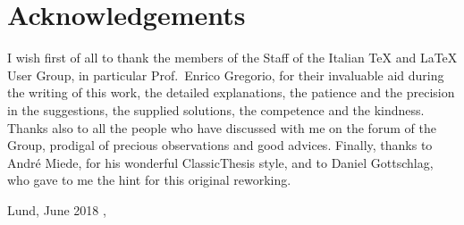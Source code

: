 
\begingroup
\let\clearpage\relax
\let\cleardoublepage\relax
\let\cleardoublepage\relax

\chapter*{Acknowledgements}
\rmfamily
I wish first of all to thank the members of the Staff of the Italian \TeX{} and \LaTeX{} User Group, in particular Prof.~Enrico Gregorio, for their invaluable aid during the writing of this work, the detailed explanations, the patience and the precision in the suggestions, the supplied solutions, the competence and the kindness. Thanks also to all the people who have discussed with me on the forum of the Group, prodigal of precious observations and good advices.
\noindent
Finally, thanks to Andr\'e Miede, for his wonderful ClassicThesis style, and to Daniel Gottschlag, who gave to me the hint for this original reworking.


\vspace{1.5cm}
\hfill Lund, June 2018 \newline
\vspace{0.1cm}
\hfill \myNameFanny, \myNameLina

\endgroup



